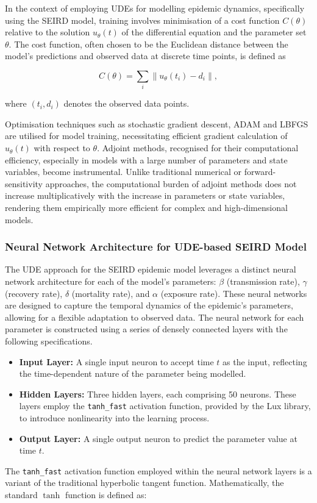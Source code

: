\documentclass[12pt]{article}
\begin{document}
In the context of employing UDEs for modelling epidemic dynamics, specifically using the SEIRD model, training involves minimisation of a cost function \(C(\theta)\) relative to the solution \(u_{\theta}(t)\) of the differential equation and the parameter set \(\theta\). The cost function, often chosen to be the Euclidean distance between the model's predictions and observed data at discrete time points, is defined as

\begin{equation}
    C(\theta) = \sum_{i} \lVert u_{\theta}(t_i) - d_i \rVert,
\end{equation}

where \((t_i, d_i)\) denotes the observed data points.

Optimisation techniques such as stochastic gradient descent, ADAM and LBFGS are utilised for model training, necessitating efficient gradient calculation of \(u_{\theta}(t)\) with respect to \(\theta\). Adjoint methods, recognised for their computational efficiency, especially in models with a large number of parameters and state variables, become instrumental. Unlike traditional numerical or forward-sensitivity approaches, the computational burden of adjoint methods does not increase multiplicatively with the increase in parameters or state variables, rendering them empirically more efficient for complex and high-dimensional models.

\subsubsection{Neural Network Architecture for UDE-based SEIRD Model}

The UDE approach for the SEIRD epidemic model leverages a distinct neural network architecture for each of the model's parameters: \(\beta\) (transmission rate), \(\gamma\) (recovery rate), \(\delta\) (mortality rate), and \(\alpha\) (exposure rate). These neural networks are designed to capture the temporal dynamics of the epidemic's parameters, allowing for a flexible adaptation to observed data. The neural network for each parameter is constructed using a series of densely connected layers with the following specifications.

\begin{itemize}
    \item \textbf{Input Layer:} A single input neuron to accept time \(t\) as the input, reflecting the time-dependent nature of the parameter being modelled.
    \item \textbf{Hidden Layers:} Three hidden layers, each comprising 50 neurons. These layers employ the \texttt{tanh\_fast} activation function, provided by the Lux library, to introduce nonlinearity into the learning process.
    \item \textbf{Output Layer:} A single output neuron to predict the parameter value at time \(t\).
\end{itemize}
The \texttt{tanh\_fast} activation function employed within the neural network layers is a variant of the traditional hyperbolic tangent function. Mathematically, the standard \(\tanh\) function is defined as:
\end{document}
